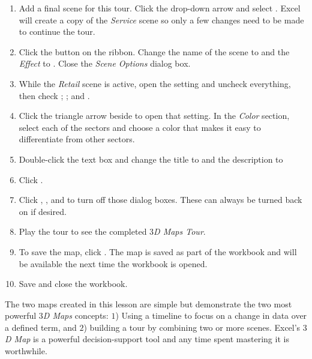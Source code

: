 \begin{enumerate}
	\item Add a final scene for this tour. Click the  drop-down arrow and select . Excel will create a copy of the \textit{Service} scene so only a few changes need to be made to continue the tour.
	\item Click the  button on the ribbon. Change the name of the scene to  and the \textit{Effect} to . Close the \textit{Scene Options} dialog box.
	\item While the \textit{Retail} scene is active, open the  setting and uncheck everything, then check ; ; and .
	\item Click the triangle arrow beside  to open that setting. In the \textit{Color} section, select each of the sectors and choose a color that makes it easy to differentiate from other sectors.
	\item Double-click the text box and change the title to  and the description to 
	\item Click .
	
	\item Click , , and  to turn off those dialog boxes. These can always be turned back on if desired.
	\item Play the tour to see the completed \textit{$ 3 $D Maps Tour}.
	\item To save the map, click . The map is saved as part of the workbook and will be available the next time the workbook is opened.
	\item Save and close the  workbook.
	
\end{enumerate}

The two maps created in this lesson are simple but demonstrate the two most powerful \textit{$ 3 $D Maps} concepts: $ 1 $) Using a timeline to focus on a change in data over a defined term, and $ 2 $) building a tour by combining two or more scenes. Excel's \textit{$ 3 $D Map} is a powerful decision-support tool and any time spent mastering it is worthwhile.

